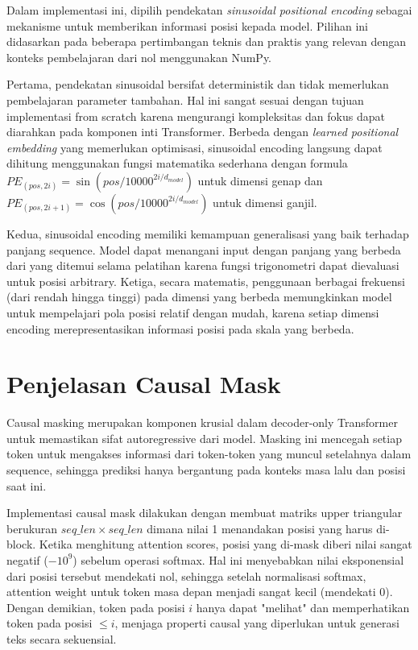 \documentclass[11pt,a4paper]{article}
\begin{document}
Dalam implementasi ini, dipilih pendekatan \textit{sinusoidal positional encoding} sebagai mekanisme untuk memberikan informasi posisi kepada model. Pilihan ini didasarkan pada beberapa pertimbangan teknis dan praktis yang relevan dengan konteks pembelajaran dari nol menggunakan NumPy.

Pertama, pendekatan sinusoidal bersifat deterministik dan tidak memerlukan pembelajaran parameter tambahan. Hal ini sangat sesuai dengan tujuan implementasi from scratch karena mengurangi kompleksitas dan fokus dapat diarahkan pada komponen inti Transformer. Berbeda dengan \textit{learned positional embedding} yang memerlukan optimisasi, sinusoidal encoding langsung dapat dihitung menggunakan fungsi matematika sederhana dengan formula $PE_{(pos,2i)} = \sin(pos/10000^{2i/d_{model}})$ untuk dimensi genap dan $PE_{(pos,2i+1)} = \cos(pos/10000^{2i/d_{model}})$ untuk dimensi ganjil.

Kedua, sinusoidal encoding memiliki kemampuan generalisasi yang baik terhadap panjang sequence. Model dapat menangani input dengan panjang yang berbeda dari yang ditemui selama pelatihan karena fungsi trigonometri dapat dievaluasi untuk posisi arbitrary. Ketiga, secara matematis, penggunaan berbagai frekuensi (dari rendah hingga tinggi) pada dimensi yang berbeda memungkinkan model untuk mempelajari pola posisi relatif dengan mudah, karena setiap dimensi encoding merepresentasikan informasi posisi pada skala yang berbeda.

\section{Penjelasan Causal Mask}

Causal masking merupakan komponen krusial dalam decoder-only Transformer untuk memastikan sifat autoregressive dari model. Masking ini mencegah setiap token untuk mengakses informasi dari token-token yang muncul setelahnya dalam sequence, sehingga prediksi hanya bergantung pada konteks masa lalu dan posisi saat ini.

Implementasi causal mask dilakukan dengan membuat matriks upper triangular berukuran $seq\_len \times seq\_len$ dimana nilai 1 menandakan posisi yang harus di-block. Ketika menghitung attention scores, posisi yang di-mask diberi nilai sangat negatif ($-10^9$) sebelum operasi softmax. Hal ini menyebabkan nilai eksponensial dari posisi tersebut mendekati nol, sehingga setelah normalisasi softmax, attention weight untuk token masa depan menjadi sangat kecil (mendekati 0). Dengan demikian, token pada posisi $i$ hanya dapat "melihat" dan memperhatikan token pada posisi $\leq i$, menjaga properti causal yang diperlukan untuk generasi teks secara sekuensial.
\end{document}
